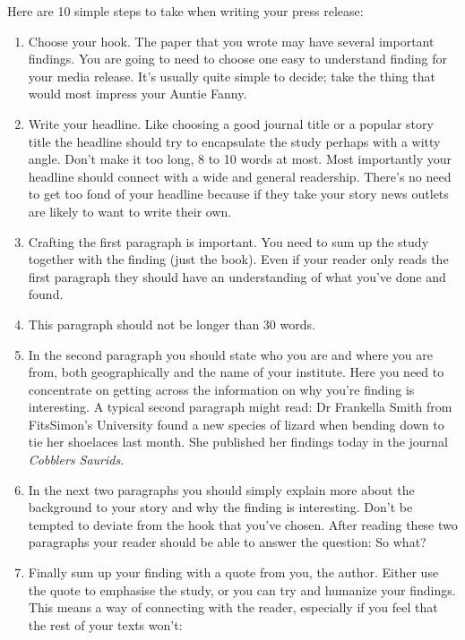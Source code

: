 \documentclass[
]{krantz}
\providecommand{\tightlist}{%
  \setlength{\itemsep}{0pt}\setlength{\parskip}{0pt}}
\begin{document}
Here are 10 simple steps to take when writing your press release:

\begin{enumerate}
\def\labelenumi{\arabic{enumi}.}
\tightlist
\item
  Choose your hook. The paper that you wrote may have several important findings. You are going to need to choose one easy to understand finding for your media release. It's usually quite simple to decide; take the thing that would most impress your Auntie Fanny.
\item
  Write your headline. Like choosing a good journal title or a popular story title the headline should try to encapsulate the study perhaps with a witty angle. Don't make it too long, 8 to 10 words at most. Most importantly your headline should connect with a wide and general readership. There's no need to get too fond of your headline because if they take your story news outlets are likely to want to write their own.
\item
  Crafting the first paragraph is important. You need to sum up the study together with the finding (just the book). Even if your reader only reads the first paragraph they should have an understanding of what you've done and found.
\item
  This paragraph should not be longer than 30 words.
\item
  In the second paragraph you should state who you are and where you are from, both geographically and the name of your institute. Here you need to concentrate on getting across the information on why you're finding is interesting. A typical second paragraph might read: Dr Frankella Smith from FitsSimon's University found a new species of lizard when bending down to tie her shoelaces last month. She published her findings today in the journal \emph{Cobblers Saurids}.
\item
  In the next two paragraphs you should simply explain more about the background to your story and why the finding is interesting. Don't be tempted to deviate from the hook that you've chosen. After reading these two paragraphs your reader should be able to answer the question: So what?
\item
  Finally sum up your finding with a quote from you, the author. Either use the quote to emphasise the study, or you can try and humanize your findings. This means a way of connecting with the reader, especially if you feel that the rest of your texts won't:
\end{enumerate}
\end{document}
